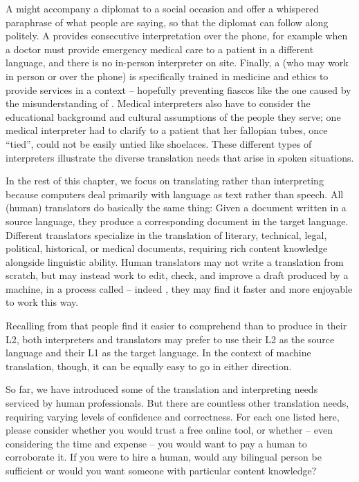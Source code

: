 A  might accompany a diplomat to a social occasion and offer a whispered paraphrase of what people are saying, so that the diplomat can follow along politely.   A  provides consecutive interpretation over the phone, for example when a doctor must provide emergency medical care to a patient in a different language, and there is no in-person interpreter on site.  Finally, a  (who may work in person or over the phone) is specifically trained in medicine and ethics to provide services in a  context -- hopefully preventing fiascos like the one caused by the misunderstanding of .  Medical interpreters also have to consider the  educational background and cultural assumptions of the people  they serve; one medical interpreter \citep{Haffner:1992}  had to clarify to a patient that her fallopian tubes, once ``tied'', could not be easily untied like shoelaces.  
These different types of interpreters illustrate the diverse translation needs that arise in spoken situations.

In the rest of this chapter, we focus on translating rather than interpreting because computers deal primarily with language as text rather than speech.
All (human) translators do basically the same thing: Given a document written in a source language, they produce a corresponding document in the target language.  Different translators  specialize in  the translation of literary, technical, legal, political, historical, or medical documents, requiring rich content knowledge alongside linguistic ability.  Human translators may not write a translation from scratch, but may instead work to edit, check, and improve a draft produced by a machine, in a process called  --  indeed \citep{Green-etal:2013}, they may find it faster and more enjoyable to work this way.

Recalling from  that people find it easier to comprehend than to produce in their L2, both interpreters and translators may prefer to  use their L2 as the source language and their L1 as the target language.  In the context of machine translation, though, it can be equally easy to go in either direction.  

So far, we have introduced some of the translation and interpreting needs serviced by human professionals.  But there are countless other translation needs, requiring varying levels of confidence and correctness.  For each one listed here,  please consider whether you would trust a free online tool, or whether -- even considering the time and expense --  you would want to pay a human to corroborate it.   If you were to hire a human, would any bilingual person be sufficient or would you want someone with particular content knowledge?


